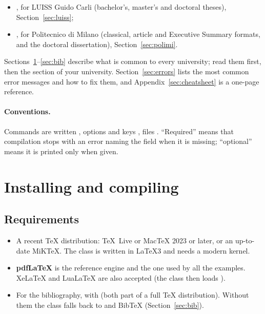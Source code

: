 \documentclass[11pt,a4paper]{article}
\begin{document}
\begin{itemize}
  \item {}, for LUISS Guido Carli (bachelor's,
    master's and doctoral theses), Section~\ref{sec:luiss};
  \item {}, for Politecnico di Milano (classical,
    article and Executive Summary formats, and the doctoral dissertation),
    Section~\ref{sec:polimi}.
\end{itemize}

Sections~\ref{sec:install}--\ref{sec:bib} describe what is common to every
university; read them first, then the section of your university.
Section~\ref{sec:errors} lists the most common error messages and how to
fix them, and Appendix~\ref{sec:cheatsheet} is a one-page reference.

\paragraph{Conventions.} Commands are written , options and
keys , files . ``Required'' means
that compilation stops with an error naming the field when it is missing;
``optional'' means it is printed only when given.

\section{Installing and compiling}
\label{sec:install}

\subsection{Requirements}

\begin{itemize}
  \item A recent \TeX{} distribution: \TeX{}~Live or Mac\TeX{} 2023 or
    later, or an up-to-date MiK\TeX. The class is written in \LaTeX3 and
    needs a modern kernel.
  \item \textbf{pdf\LaTeX} is the reference engine and the one used by all
    the examples. Xe\LaTeX{} and Lua\LaTeX{} are also accepted (the class then
    loads ).
  \item For the bibliography,  with  (both part of
    a full \TeX{} distribution). Without them the class falls back to
     and Bib\TeX{} (Section~\ref{sec:bib}).
\end{itemize}
\end{document}
